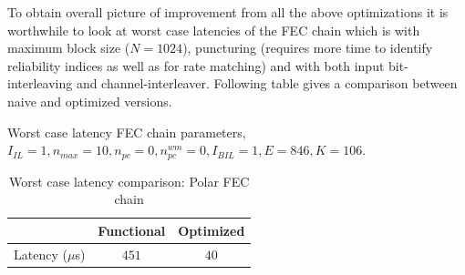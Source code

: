 To obtain overall picture of improvement from all the above optimizations it is worthwhile to look at worst case latencies of the FEC chain which is with maximum block size ($N = 1024$), puncturing (requires more time to identify reliability indices as well as for rate matching) and with both input bit-interleaving and channel-interleaver. Following table gives a comparison between naive and optimized versions.

Worst case latency FEC chain parameters, \newline
$I_{IL} = 1, n_{max} = 10, n_{pc} = 0 ,n_{pc}^{wm} = 0, I_{BIL} = 1, E = 846, K = 106$.
\begin{table}[!h]
	\begin{center}
		\caption{Worst case latency comparison: Polar FEC chain}
		\label{tab:worstFecChain}
		\begin{tabular}{c|c|c} %
			\textbf{ } & Functional & Optimized \\
			\hline
			Latency ($\mu$s) & $451$ & $40$\\
		\end{tabular}
	\end{center}
\end{table}

